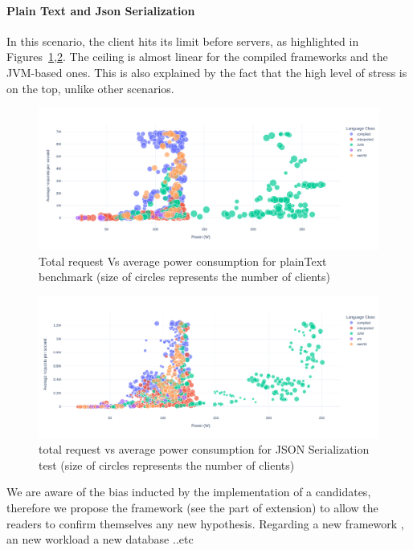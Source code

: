 \paragraph{Plain Text and Json Serialization}
In this scenario, the client hits its limit before servers, as highlighted in Figures~\ref{fig:power_requests_plaintext},\ref{fig:power_requests_json}.
The ceiling is almost linear for the compiled frameworks and the JVM-based ones.
This is also explained by the fact that the high level of stress is on the top, unlike other scenarios.

\begin{figure}[hbt]
    \centering
    \includegraphics[width=\textwidth,height=\textheight,keepaspectratio]{imgs/power_requests_plaintext}
    \caption{Total request Vs average power consumption for plainText benchmark (size of circles represents the number of clients)}
    \label{fig:power_requests_plaintext}
\end{figure}

\begin{figure}[hbt]
    \centering
    \includegraphics[width=\textwidth,height=\textheight,keepaspectratio]{imgs/power_requests_json}
    \caption{total request vs average power consumption for JSON Serialization test (size of circles represents the number of clients)}
    \label{fig:power_requests_json}
\end{figure}

We are aware of the bias inducted by the implementation of a candidates, therefore we propose the framework (see the part of extension) to allow the readers to confirm themselves any new hypothesis.
Regarding a new framework , an new workload a new database ..etc

